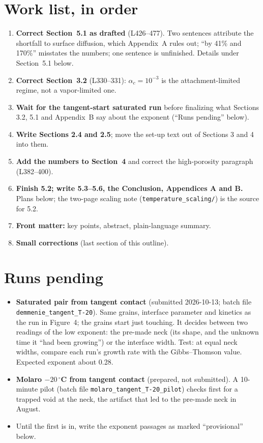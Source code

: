 \documentclass[11pt]{article}
\begin{document}
\section*{Work list, in order}
\begin{enumerate}
\item \textbf{Correct Section~5.1 as drafted} (L426--477). Two sentences
  attribute the shortfall to surface diffusion, which Appendix~A rules out;
  ``by 41\% and 170\%'' misstates the numbers; one sentence is unfinished.
  Details under Section~5.1 below.
\item \textbf{Correct Section~3.2} (L330--331): $\alpha_c = 10^{-3}$ is the
  attachment-limited regime, not a vapor-limited one.
\item \textbf{Wait for the tangent-start saturated run} before finalizing
  what Sections 3.2, 5.1 and Appendix~B say about the exponent (``Runs
  pending'' below).
\item \textbf{Write Sections 2.4 and 2.5}; move the set-up text out of
  Sections 3 and 4 into them.
\item \textbf{Add the numbers to Section~4} and correct the high-porosity
  paragraph (L382--400).
\item \textbf{Finish 5.2; write 5.3--5.6, the Conclusion, Appendices A and
  B.} Plans below; the two-page scaling note
  (\texttt{temperature\_scaling/}) is the source for 5.2.
\item \textbf{Front matter:} key points, abstract, plain-language summary.
\item \textbf{Small corrections} (last section of this outline).
\end{enumerate}

\section*{Runs pending}
\begin{itemize}
\item \textbf{Saturated pair from tangent contact} (submitted 2026-10-13;
  batch file \texttt{demmenie\_\allowbreak tangent\_\allowbreak T-20}). Same grains, interface
  parameter and kinetics as the run in Figure~4; the grains start just
  touching. It decides between two readings of the low exponent: the
  pre-made neck (its shape, and the unknown time it ``had been growing'')
  or the interface width. Test: at equal neck widths, compare each run's
  growth rate with the Gibbs--Thomson value. Expected exponent about 0.28.
\item \textbf{Molaro $-20\,^{\circ}$C from tangent contact} (prepared, not
  submitted). A 10-minute pilot (batch file
  \texttt{molaro\_tangent\_T-20\_pilot}) checks first for a trapped void at
  the neck, the artifact that led to the pre-made neck in August.
\item Until the first is in, write the exponent passages as marked
  ``provisional'' below.
\end{itemize}
\end{document}
